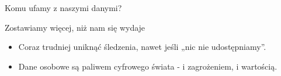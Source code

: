     \begin{frame}{Komu ufamy z naszymi danymi?}
    \begin{alertblock}{Zostawiamy więcej, niż nam się wydaje}
        \begin{itemize}
          \item Coraz trudniej uniknąć śledzenia, nawet jeśli „nic nie udostępniamy”.
          \item Dane osobowe są paliwem cyfrowego świata - i zagrożeniem, i wartością.
        \end{itemize}
    \end{alertblock}
    \end{frame}